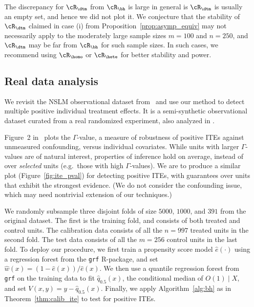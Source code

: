 The discrepancy  for $\cR_{\dtm}$ from $\cR_{\bh}$ is large in general is $\cR_{\dtm}$ is usually an empty set, and hence we did not plot it.
We conjecture that the stability of $\cR_{\dtm}$
claimed in case (i) from Proposition~\ref{prop:asymp_equiv}
may not necessarily apply to the moderately large sample sizes $m=100$ and $n=250$,
and  $\cR_{\dtm}$ may be
far from $\cR_{\bh}$ for such sample sizes.
In such cases, we recommend using $\cR_\homo$ or
$\cR_{\hete}$ for better stability and power.


\subsection{Real data analysis}

We revisit the NSLM observational dataset from~\cite{carvalho2019assessing}
and use our method to detect multiple positive individual treatment effects.
It is a semi-synthetic observational dataset
curated from a real randomized experiment,
also analyzed in \cite{lei2021conformal,jin2023sensitivity}.


Figure~2 in~\cite{jin2023sensitivity} plots
the $\Gamma$-value, a measure of robustness of positive ITEs against
unmeasured confounding, versus individual covariates.
While units with larger $\Gamma$-values are of natural interest,
properties of inference hold on average, instead of
over \emph{selected} units (e.g.~those with high $\Gamma$-values).
We are to produce a similar plot (Figure~\ref{fig:ite_pval})
for detecting positive ITEs,
with guarantees over units that exhibit the strongest evidence.
(We do not consider the confounding issue,
which may need
nontrivial extension of our techniques.)


We randomly subsample three disjoint folds of size $5000$, $1000$,
and $391$ from the original dataset.
The first is the training fold, and consists of both
treated and control units.
The calibration data consists of all the $n = 997$ treated units
in the second fold.
The test data
consists of all the $m = 256$ control units
in the last fold.
%
To deploy our  procedure, we first train a propensity score model $\hat{e}(\cdot)$ using a
regression forest from the \texttt{grf} R-package, and set
$\hat{w}(x) = (1-\hat{e}(x))/{\hat{e}(x)}$.
We then use a quantile regression forest from \texttt{grf}
on the training data to fit $\hat{q}_{0.5}(x)$,
the conditional median of $O(1) \mid X$,
and set
$V(x,y) = y - \hat{q}_{0.5}(x)$.
Finally, we apply Algorithm~\ref{alg:bh} as
in Theorem~\ref{thm:calib_ite} to test for positive ITEs.

